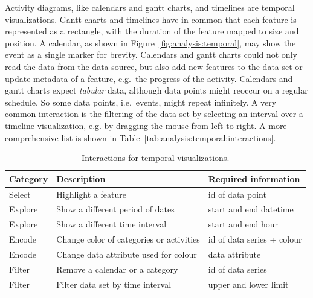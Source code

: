 Activity diagrams, like calendars and gantt charts, and timelines are temporal visualizations.
Gantt charts and timelines have in common that each feature is represented as a rectangle, with the duration of the feature mapped to size and position.
A calendar, as shown in Figure~\ref{fig:analysis:temporal}, may show the event as a single marker for brevity.
Calendars and gantt charts could not only read the data from the data source, but also add new features to the data set or update metadata of a feature, e.g.\ the progress of the activity.
Calendars and gantt charts expect \emph{tabular} data, although data points might reoccur on a regular schedule.
So some data points, i.e.\ events, might repeat infinitely.
A very common interaction is the filtering of the data set by selecting an interval over a timeline visualization, e.g. by dragging the mouse from left to right.
A more comprehensive list is shown in Table~\ref{tab:analysis:temporal:interactions}.


\begin{table}
  \caption{Interactions for temporal visualizations.}%
  \label{fig:analysis:temporal:interactions}
  \begin{tabularx}{\linewidth}{lXX}
    \bf Category & \bf Description & \bf Required information \\
    \hline
    Select & Highlight a feature & id of data point \\
    Explore & Show a different period of dates & start and end datetime \\
    Explore & Show a different time interval & start and end hour\\
    Encode & Change color of categories or activities & id of data series + colour \\
    Encode & Change data attribute used for colour & data attribute \\
    Filter & Remove a calendar or a category & id of data series \\
    Filter & Filter data set by time interval & upper and lower limit \\
  \end{tabularx}
\end{table}


